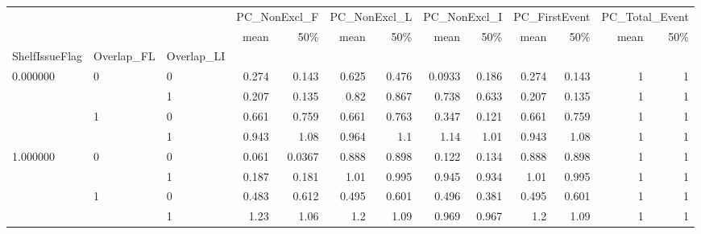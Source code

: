 \begin{tabular}{lllrrrrrrrrrr}
\toprule
 &  &  & \multicolumn{2}{r}{PC\_NonExcl\_F} & \multicolumn{2}{r}{PC\_NonExcl\_L} & \multicolumn{2}{r}{PC\_NonExcl\_I} & \multicolumn{2}{r}{PC\_FirstEvent} & \multicolumn{2}{r}{PC\_Total\_Event} \\
 &  &  & mean & 50\% & mean & 50\% & mean & 50\% & mean & 50\% & mean & 50\% \\
ShelfIssueFlag & Overlap_FL & Overlap_LI &  &  &  &  &  &  &  &  &  &  \\
\midrule
\multirow[t]{4}{*}{0.000000} & \multirow[t]{2}{*}{0} & 0 & 0.274 & 0.143 & 0.625 & 0.476 & 0.0933 & 0.186 & 0.274 & 0.143 & 1 & 1 \\
 &  & 1 & 0.207 & 0.135 & 0.82 & 0.867 & 0.738 & 0.633 & 0.207 & 0.135 & 1 & 1 \\
\cline{2-13}
 & \multirow[t]{2}{*}{1} & 0 & 0.661 & 0.759 & 0.661 & 0.763 & 0.347 & 0.121 & 0.661 & 0.759 & 1 & 1 \\
 &  & 1 & 0.943 & 1.08 & 0.964 & 1.1 & 1.14 & 1.01 & 0.943 & 1.08 & 1 & 1 \\
\cline{1-13} \cline{2-13}
\multirow[t]{4}{*}{1.000000} & \multirow[t]{2}{*}{0} & 0 & 0.061 & 0.0367 & 0.888 & 0.898 & 0.122 & 0.134 & 0.888 & 0.898 & 1 & 1 \\
 &  & 1 & 0.187 & 0.181 & 1.01 & 0.995 & 0.945 & 0.934 & 1.01 & 0.995 & 1 & 1 \\
\cline{2-13}
 & \multirow[t]{2}{*}{1} & 0 & 0.483 & 0.612 & 0.495 & 0.601 & 0.496 & 0.381 & 0.495 & 0.601 & 1 & 1 \\
 &  & 1 & 1.23 & 1.06 & 1.2 & 1.09 & 0.969 & 0.967 & 1.2 & 1.09 & 1 & 1 \\
\cline{1-13} \cline{2-13}
\bottomrule
\end{tabular}
